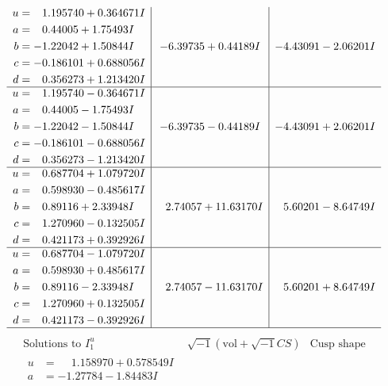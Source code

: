 \documentclass[1p]{elsarticle_modified}
\theoremstyle{definition}
\newcommand{\I}{\sqrt{-1}}
\begin{document}
$$\begin{array}{c|c|c}
\begin{aligned}
u &= \phantom{-}1.195740 + 0.364671 I \\
a &= \phantom{-}0.44005 + 1.75493 I \\
b &= -1.22042 + 1.50844 I \\
c &= -0.186101 + 0.688056 I \\
d &= \phantom{-}0.356273 + 1.213420 I\end{aligned}
 & -6.39735 + 0.44189 I & -4.43091 - 2.06201 I \\ \hline\begin{aligned}
u &= \phantom{-}1.195740 - 0.364671 I \\
a &= \phantom{-}0.44005 - 1.75493 I \\
b &= -1.22042 - 1.50844 I \\
c &= -0.186101 - 0.688056 I \\
d &= \phantom{-}0.356273 - 1.213420 I\end{aligned}
 & -6.39735 - 0.44189 I & -4.43091 + 2.06201 I \\ \hline\begin{aligned}
u &= \phantom{-}0.687704 + 1.079720 I \\
a &= \phantom{-}0.598930 - 0.485617 I \\
b &= \phantom{-}0.89116 + 2.33948 I \\
c &= \phantom{-}1.270960 - 0.132505 I \\
d &= \phantom{-}0.421173 + 0.392926 I\end{aligned}
 & \phantom{-}2.74057 + 11.63170 I & \phantom{-}5.60201 - 8.64749 I \\ \hline\begin{aligned}
u &= \phantom{-}0.687704 - 1.079720 I \\
a &= \phantom{-}0.598930 + 0.485617 I \\
b &= \phantom{-}0.89116 - 2.33948 I \\
c &= \phantom{-}1.270960 + 0.132505 I \\
d &= \phantom{-}0.421173 - 0.392926 I\end{aligned}
 & \phantom{-}2.74057 - 11.63170 I & \phantom{-}5.60201 + 8.64749 I\\
 \hline 
 \end{array}$$\newpage$$\begin{array}{c|c|c}  
\text{Solutions to }I^u_{1}& \I (\text{vol} + \sqrt{-1}CS) & \text{Cusp shape}\\
 \hline 
\begin{aligned}
u &= \phantom{-}1.158970 + 0.578549 I \\
a &= -1.27784 - 1.84483 I \\

\end{aligned}
\end{array}$$
\end{document}

